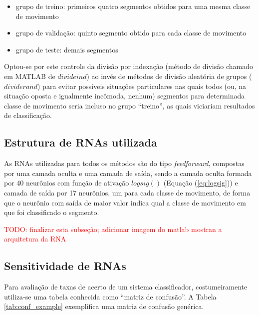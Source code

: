 \begin{itemize}
\item grupo de treino: primeiros quatro segmentos obtidos para uma mesma classe de movimento
\item grupo de validação: quinto segmento obtido para cada classe de movimento
\item grupo de teste: demais segmentos
\end{itemize}

Optou-se por este controle da divisão por indexação (método de divisão chamado em MATLAB de $divideind$) ao invés de métodos de divisão aleatória de grupos ($dividerand$) para evitar possíveis situações particulares nas quais todos (ou, na situação oposta e igualmente incômoda, nenhum) segmentos para determinada classe de movimento seria incluso no grupo ``treino'', as quais viciariam resultados de classificação.

			\subsection{Estrutura de RNAs utilizada}
As RNAs utilizadas para todos os métodos são do tipo \emph{feedforward}, compostas por uma camada oculta e uma camada de saída, sendo a camada oculta formada por 40 neurônios com função de ativação $logsig()$ (Equação (\ref{eq:logsig})) e camada de saída por 17 neurônios, um para cada classe de movimento, de forma que o neurônio com saída de maior valor indica qual a classe de movimento em que foi classificado o segmento. 

\textcolor{red}{TODO: finalizar esta subseção; adicionar imagem do matlab mostran a arquitetura da RNA}

			\subsection{Sensitividade de RNAs}
Para avaliação de taxas de acerto de um sistema classificador, costumeiramente utiliza-se uma tabela conhecida como ``matriz de confusão''. A Tabela \ref{tab:conf_example} exemplifica uma matriz de confusão genérica.

